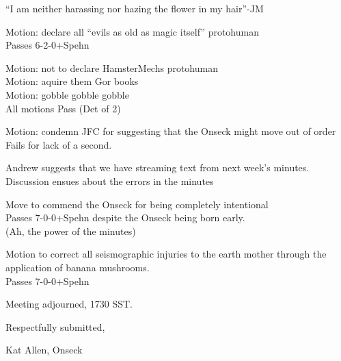 \documentclass[10pt]{article}
\begin{document}
``I am neither harassing nor hazing the flower in my hair''-JM

Motion: declare all ``evils as old as magic itself'' protohuman\\
Passes 6-2-0+Spehn

Motion: not to declare HamsterMechs protohuman\\
Motion: aquire them Gor books\\
Motion: gobble gobble gobble\\
All motions Pass (Det of 2)

Motion: condemn JFC for suggesting that the Onseck might move out of order\\
Fails for lack of a second.

Andrew suggests that we have streaming text from next week's minutes.
Discussion ensues about the errors in the minutes

Move to commend the Onseck for being completely intentional\\
Passes 7-0-0+Spehn despite the Onseck being born early.\\
(Ah, the power of the minutes)

Motion to correct all seismographic injuries to the earth mother
through the application of banana mushrooms.\\
Passes 7-0-0+Spehn


\vspace{12pt}

\noindent
Meeting adjourned, 1730 SST.

\vspace{18pt}

\centerline{Respectfully submitted,}
\centerline{Kat Allen,  Onseck}
\end{document}
